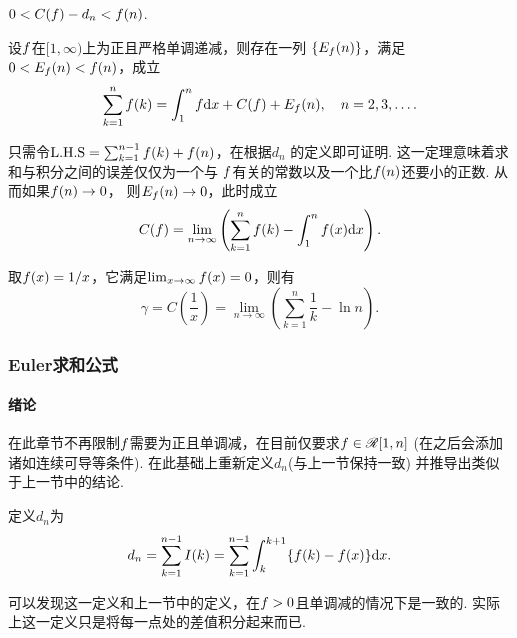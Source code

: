     \begin{pos}[余项估计]
      $0 < C(\mathnormal{f}) - d_n < \mathnormal{f}(n)$.
    \end{pos}

    \begin{thm}
      设$\mathnormal{f}$在$[1,\infty)$上为正且严格单调递减，则存在一列
      $\{E_{\mathnormal{f}}(n)\}$，满足$0<E_{\mathnormal{f}}(n) < \mathnormal{f}(n)$，成立
      \begin{equation}
        \sum_{k=1}^n\mathnormal{f}(k) = \int_1^n\mathnormal{f}\mathrm{d} x + C(\mathnormal{f}) + E_{\mathnormal{f}}(n),
        \quad n = 2,3,\dots.
      \end{equation}
    \end{thm}
    \remark
      只需令$\text{L.H.S} = \sum_{k=1}^{n-1}\mathnormal{f}(k) + \mathnormal{f}(n)$，在根据$d_n$
      的定义即可证明. 这一定理意味着求和与积分之间的误差仅仅为一个与
      $\mathnormal{f}$有关的常数以及一个比$\mathnormal{f}(n)$还要小的正数. 从而如果$\mathnormal{f}(n)\to 0$，
      则$E_{\mathnormal{f}}(n)\to 0$，此时成立
      \begin{equation}
        C(\mathnormal{f}) = \lim_{n\to\infty}\left(
          \sum_{k=1}^n \mathnormal{f}(k) - \int_1^n\mathnormal{f}(x)\mathrm{d} x
        \right).
      \end{equation}

    \begin{defi}[经典Euler常数]
      取$\mathnormal{f}(x) = 1/x$，它满足$\lim_{x\to\infty}\mathnormal{f}(x) = 0$，则有
      \[
        \gamma = C(\frac{1}{x}) = \lim_{n\to\infty}\left(
          \sum_{k=1}^n\frac{1}{k} - \ln n
        \right).
      \]
    \end{defi}

  \subsubsection{Euler求和公式}
    \paragraph{绪论}
      在此章节不再限制$\mathnormal{f}$需要为正且单调减，在目前仅要求$\mathnormal{f}\in\mathscr{R}[1, n]$
      (在之后会添加诸如连续可导等条件). 在此基础上重新定义$d_n$(与上一节保持一致)
      并推导出类似于上一节中的结论.

    \begin{defi}[$d_n$]
      定义$d_n$为
      \begin{equation}
        d_n = \sum_{k=1}^{n-1}I(k) =
        \sum_{k=1}^{n-1} \int_{k}^{k+1}\{ \mathnormal{f}(k) - \mathnormal{f}(x) \}\mathrm{d} x.
      \end{equation}
    \end{defi}
    \remark
      可以发现这一定义和上一节中的定义，在$\mathnormal{f}>0$且单调减的情况下是一致的.
      实际上这一定义只是将每一点处的差值积分起来而已.

